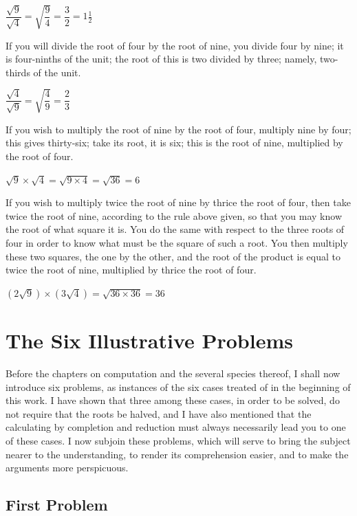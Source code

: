\documentclass[11pt,a4paper,openany,oneside]{book}
\begin{document}
$\dfrac{\sqrt{9}}{\sqrt{4}} = \sqrt{\dfrac{9}{4}} = \dfrac{3}{2} = 1\tfrac{1}{2}$

If you will divide the root of four by the root of nine, you divide four by
nine; it is four-ninths of the unit; the root of this is two divided by
three; namely, two-thirds of the unit.

$\dfrac{\sqrt{4}}{\sqrt{9}} = \sqrt{\dfrac{4}{9}} = \dfrac{2}{3}$

If you wish to multiply the root of nine by the root of four, multiply nine
by four; this gives thirty-six; take its root, it is six; this is the root
of nine, multiplied by the root of four.

$\sqrt{9} \times \sqrt{4} = \sqrt{9 \times 4} = \sqrt{36} = 6$

If you wish to multiply twice the root of nine by thrice the root of four,
then take twice the root of nine, according to the rule above given, so that
you may know the root of what square it is. You do the same with respect to
the three roots of four in order to know what must be the square of such a
root. You then multiply these two squares, the one by the other, and the root
of the product is equal to twice the root of nine, multiplied by thrice the
root of four.

$(2\sqrt{9}) \times (3\sqrt{4}) = \sqrt{36 \times 36} = 36$

\newpage

\chapter{The Six Illustrative Problems}
\label{ch:six-problems}

Before the chapters on computation and the several species thereof, I shall
now introduce six problems, as instances of the six cases treated of in the
beginning of this work. I have shown that three among these cases, in order
to be solved, do not require that the roots be halved, and I have also
mentioned that the calculating by completion and reduction must always
necessarily lead you to one of these cases. I now subjoin these problems,
which will serve to bring the subject nearer to the understanding, to render
its comprehension easier, and to make the arguments more perspicuous.

\section*{First Problem}
\end{document}
